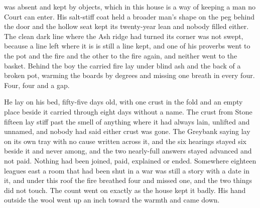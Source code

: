 was absent and kept by objects, which in this house is a way of keeping a man no Court can enter. His salt-stiff coat held a broader man's shape on the peg behind the door and the hollow seat kept its twenty-year lean and nobody filled either. The clean dark line where the Ash ridge had turned its corner was not swept, because a line left where it is is still a line kept, and one of his proverbs went to the pot and the fire and the other to the fire again, and neither went to the basket. Behind the boy the carried fire lay under blind ash and the back of a broken pot, warming the boards by degrees and missing one breath in every four. Four, four and a gap.

He lay on his bed, fifty-five days old, with one crust in the fold and an empty place beside it carried through eight days without a name. The crust from Stone fifteen lay stiff past the smell of anything where it had always lain, unlifted and unnamed, and nobody had said either crust was gone. The Greybank saying lay on its own tray with no cause written across it, and the six hearings stayed six beside it and never among, and the two nearly-full answers stayed advanced and not paid. Nothing had been joined, paid, explained or ended. Somewhere eighteen leagues east a room that had been shut in a war was still a story with a date in it, and under this roof the fire breathed four and missed one, and the two things did not touch. The count went on exactly as the house kept it badly. His hand outside the wool went up an inch toward the warmth and came down.
